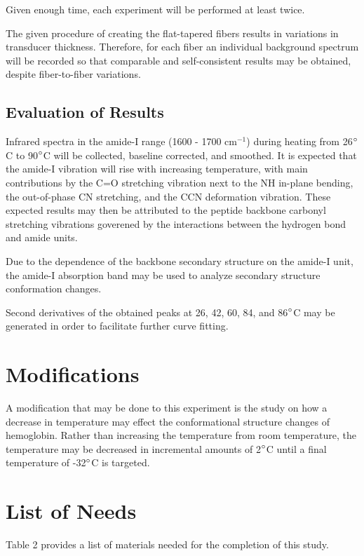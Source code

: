 \documentclass{article}
\begin{document}
Given enough time, each experiment will be performed at least twice.

The given procedure of creating the flat-tapered fibers results in variations in
transducer thickness. Therefore, for each fiber an individual background
spectrum will be recorded so that comparable and self-consistent results may be
obtained, despite fiber-to-fiber variations.


\subsection*{Evaluation of Results}
Infrared spectra in the amide-I range (1600 - 1700 cm$^{-1}$) during heating
from 26$\degree$C to 90$\degree$C will be collected, baseline corrected, and
smoothed. 
It is expected that the amide-I vibration will rise with increasing temperature,
with main contributions by the C=O stretching vibration next to the NH in-plane
bending, the out-of-phase CN stretching, and the CCN deformation vibration.
These expected results may then be attributed to the peptide backbone carbonyl
stretching vibrations goverened by the interactions between the hydrogen bond and
amide units.\cite{hemo}

Due to the dependence of the backbone secondary structure on the amide-I unit,
the amide-I absorption band may be used to analyze secondary structure
conformation changes.

Second derivatives of the obtained peaks at 26, 42, 60, 84, and 86$\degree$C may
be generated in order to facilitate further curve fitting.


\section*{Modifications}
A modification that may be done to this experiment is the study on how a
decrease in temperature may effect the conformational structure changes of
hemoglobin. Rather than increasing the temperature from room temperature, the
temperature may be decreased in incremental amounts of 2$\degree$C until a final
temperature of -32$\degree$C is targeted.


\newpage



\newpage
\section*{List of Needs}
Table 2 provides a list of materials needed for the completion of this study.
\end{document}
